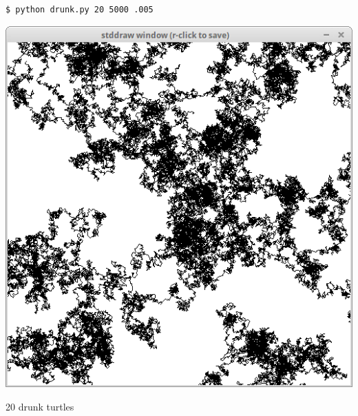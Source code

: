 \documentclass[8pt,a4paper,compress,handout]{beamer}
\begin{document}
\begin{frame}[fragile]
\begin{minipage}{200pt}
\begin{lstlisting}[language={}]
$ python drunk.py 20 5000 .005
\end{lstlisting}
\end{minipage}%
\hfill
\begin{minipage}{100pt}
\begin{center}
\includegraphics[scale=0.2]{figures/drunks.png}

\smallskip

\tiny 20 drunk turtles
\end{center}
\end{minipage}
\end{frame}
\end{document}

